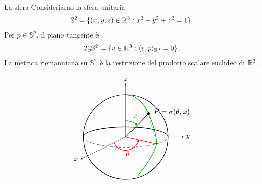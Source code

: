 \documentclass[a4paper]{article}
\begin{document}
\begin{snippetexample}{La sfera}
Consideriamo la sfera unitaria
\[
    \mathbb{S}^2
    =
    \{(x,y,z)\in\mathbb{R}^3:x^2+y^2+z^2=1\}.
\]
Per \(p\in\mathbb{S}^2\), il piano tangente è
\[
    T_p\mathbb{S}^2
    =
    \{v\in\mathbb{R}^3:\langle v,p\rangle_{\mathbb{R}^3}=0\}.
\]
La metrica riemanniana su \(\mathbb{S}^2\) è la restrizione del prodotto scalare euclideo di \(\mathbb{R}^3\).

\[
\begin{tikzpicture}[scale=1.05, line cap=round, line join=round, >=stealth]
    \def\R{2.0}
    \def\e{0.48}

    \coordinate (O) at (0,0);
    \coordinate (P) at (1.08,1.12);
    \coordinate (Q) at (1.46,-0.33); %
    \coordinate (Xdir) at (-2.15,-1.05);

    \draw[thick] (O) circle[radius=\R];

    \draw[dashed]
        (-\R,0) arc[start angle=180, end angle=360, x radius=\R, y radius=\e];
    \draw[thick]
        (\R,0) arc[start angle=0, end angle=180, x radius=\R, y radius=\e];

    \draw[->] (O) -- (0,2.55) node[above] {\(z\)};
    \draw[->] (O) -- (2.75,0) node[right] {\(y\)};
    \draw[->] (O) -- (Xdir) node[left] {\(x\)};

    \draw[green!60!black, thick]
        plot[smooth] coordinates{
            (0,2.00)
            (0.35,1.92)
            (0.75,1.62)
            (P)
            (1.34,0.42)
            (Q)
            (1.15,-1.02)
            (0.58,-1.82)
        };

    \draw[thick] (O) -- (P);

    \draw[dashed] (Q) -- (P);

    \draw[red, thick] (O) -- (Q);

    \fill (P) circle[radius=1.8pt];
    \node[anchor=west, xshift=4pt, yshift=2pt] at (P)
        {\(P=\sigma(\theta,\varphi)\)};

    \draw[red, thick, ->]
        (-154:0.62) arc[start angle=-154, end angle=-13, radius=0.62];
    \node[red] at (0.10,-0.78) {\(\theta\)};

    \draw[green!60!black, thick, ->]
        (90:0.78) arc[start angle=90, end angle=46, radius=0.78];
    \node[green!60!black] at (0.42,0.97) {\(\varphi\)};
\end{tikzpicture}
\]


\end{snippetexample}
\end{document}
